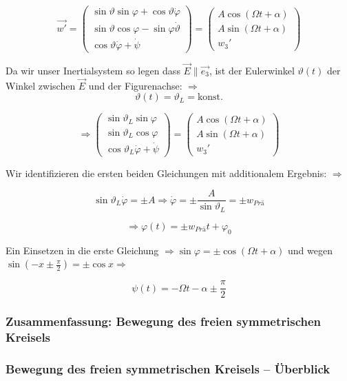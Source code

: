 \documentclass[10pt, letterpaper]{article}
\begin{document}
\[
\vec{w'} = \begin{pmatrix}
\sin\vartheta \sin\varphi + \cos\vartheta \dot{\varphi} \\
\sin\vartheta \cos\varphi - \sin\varphi \dot{\vartheta} \\
\cos\vartheta \dot{\varphi} + \dot{\psi}
\end{pmatrix} = \begin{pmatrix}
A \cos(\Omega t + \alpha) \\
A \sin(\Omega t + \alpha) \\
w_3'
\end{pmatrix}
\]

Da wir unser Inertialsystem so legen dass $\vec{E} \parallel \vec{e_3}$, ist der Eulerwinkel $\vartheta(t)$ der Winkel zwischen $\vec{E}$ und der Figurenachse: $\Rightarrow$
\[\vartheta(t) = \vartheta_L = \text{konst.}\]

\[\Rightarrow \begin{pmatrix}
\sin\vartheta_L \sin\varphi \\
\sin\vartheta_L \cos\varphi \\
\cos\vartheta_L \dot{\varphi} + \dot{\psi}
\end{pmatrix} = \begin{pmatrix}
A \cos(\Omega t + \alpha) \\
A \sin(\Omega t + \alpha) \\
w_3'
\end{pmatrix}\]

Wir identifizieren die ersten beiden Gleichungen mit additionalem Ergebnis: $\Rightarrow$

\[\sin\vartheta_L \dot{\varphi} = \pm A \Rightarrow \dot{\varphi} = \pm \frac{A}{\sin\vartheta_L} = \pm w_{Prä}\]

\[\Rightarrow \varphi(t) = \pm w_{Prä}t + \varphi_0\]

Ein Einsetzen in die erste Gleichung $\Rightarrow \sin\varphi = \pm \cos(\Omega t + \alpha)$
und wegen $\sin(-x \pm \frac{\pi}{2}) = \pm \cos x \Rightarrow$

\[\psi(t) = -\Omega t - \alpha \pm \frac{\pi}{2}\]



\subsubsection*{Zusammenfassung: Bewegung des freien symmetrischen Kreisels}



\subsubsection*{Bewegung des freien symmetrischen Kreisels – Überblick}
\end{document}
